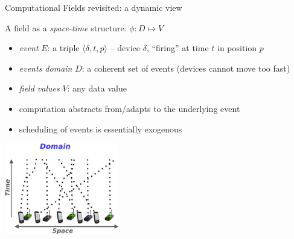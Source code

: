 \documentclass[presentation, 8pt]{beamer}\mode<presentation>{\usetheme{AMSBolognaFC}}
\begin{document}
\begin{frame}{Computational Fields revisited: a dynamic view}
\begin{alertblock}{A field as a \textit{space-time} structure: $\phi:D\mapsto V$}
\begin{itemize}
		\item {\it event} $E$: a triple $\langle \delta, t, p\rangle$ -- device $\delta$, ``firing'' at time $t$ in position $p$
		\item {\it events domain} $D$: a coherent set of events (devices cannot move too fast)
		\item {\it field values} $V$: any data value
		\item[\faArrowRight] computation abstracts from/adapts to the underlying event
		\item[\faArrowRight] scheduling of events is essentially exogenous
\end{itemize}
\end{alertblock}
\begin{center}
\includegraphics[height=4cm]{img/spacetime1.pdf}~~~~~~~~~~
\end{center}
\end{frame}
\end{document}
